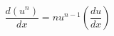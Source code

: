 \documentclass[12pt]{article}
\begin{document}
\sicpsize
\[
\frac{d(u^n)}{dx} = n u^{n-1} \left(\frac{du}{dx}\right)
\]
\end{document}
